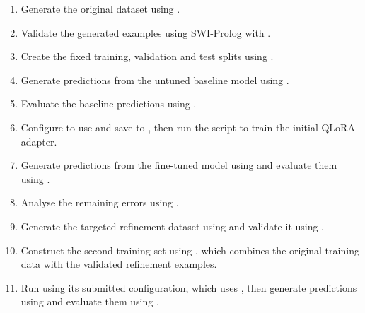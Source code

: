 \documentclass[11pt]{article} %
\theoremstyle{plain}
\theoremstyle{definition}
\begin{document}
\begin{enumerate}

    \item Generate the original dataset using
    .

    \item Validate the generated examples using SWI-Prolog with
    .

    \item Create the fixed training, validation and test splits using
    .

    \item Generate predictions from the untuned baseline model using
    .

    \item Evaluate the baseline predictions using
    .

    \item Configure  to use
     and save to
    , then run the script to train
    the initial QLoRA adapter.

    \item Generate predictions from the fine-tuned model using
     and evaluate them using
    .

    \item Analyse the remaining errors using
    .

    \item Generate the targeted refinement dataset using
     and validate it using
    .

    \item Construct the second training set using
    , which combines the original
    training data with the validated refinement examples.

    \item Run  using its submitted
    configuration, which uses , then
    generate predictions using  and
    evaluate them using
    .

\end{enumerate}
\end{document}

